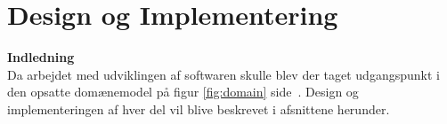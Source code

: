 \section{Design og Implementering}

\textbf{Indledning} \\

Da arbejdet med udviklingen af softwaren skulle blev der taget udgangspunkt i den opsatte domænemodel på figur \ref{fig:domain} side~\pageref{fig:domain}. Design og implementeringen af hver del vil blive beskrevet i afsnittene herunder.




